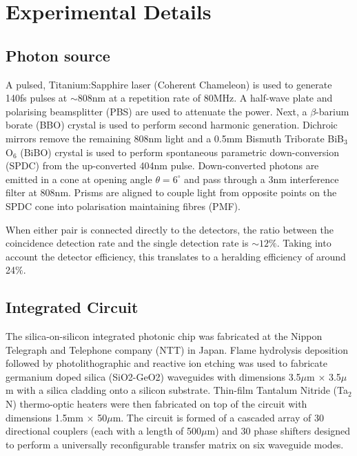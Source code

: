 \section{Experimental Details}%
\label{sec:pl.experimental_details}

\subsection{Photon source}
A pulsed, Titanium:Sapphire laser (Coherent Chameleon) is used to generate 140fs pulses at $\sim808$nm at a repetition rate of $80$MHz.
A half-wave plate and polarising beamsplitter (PBS) are used to attenuate the power.
Next, a $\beta$-barium borate (BBO) crystal is used to perform second harmonic generation.
Dichroic mirrors remove the remaining 808nm light and a 0.5mm Bismuth Triborate BiB$_3$O$_6$ (BiBO) crystal is used to perform spontaneous parametric down-conversion (SPDC) from the up-converted 404nm pulse.
Down-converted photons are emitted in a cone at opening angle $\theta = 6^{\circ}$ and pass through a 3nm interference filter at 808nm.
Prisms are aligned to couple light from opposite points on the SPDC cone into polarisation maintaining fibres (PMF).

When either pair is connected directly to the detectors, the ratio between the coincidence detection rate and the single detection rate is $\sim12\%$.
Taking into account the detector efficiency, this translates to a heralding efficiency of around 24$\%$.

\subsection{Integrated Circuit}
The silica-on-silicon integrated photonic chip was fabricated at the Nippon Telegraph and Telephone company (NTT) in Japan.
Flame hydrolysis deposition followed by photolithographic and reactive ion etching was used to fabricate germanium doped silica (SiO2-GeO2) waveguides with dimensions 3.5$\mu$m $\times$ 3.5$\mu$m with a silica cladding onto a silicon substrate.
Thin-film Tantalum Nitride (Ta$_2$N) thermo-optic heaters were then fabricated on top of the circuit with dimensions 1.5mm $\times$ 50$\mu$m.
The circuit is formed of a cascaded array of 30 directional couplers (each with a length of 500$\mu$m) and 30 phase shifters designed to perform a universally reconfigurable transfer matrix on six waveguide modes.

